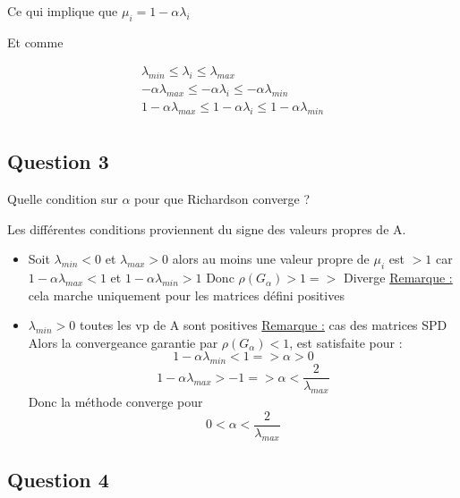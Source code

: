 \documentclass[11pt]{article}
\begin{document}
Ce qui implique que $\mu_i = 1 - \alpha \lambda_i$\newline

\vspace{5mm}

Et comme

\begin{gather*}
    \lambda_{min} \le \lambda_i \le \lambda_{max} \\
    - \alpha \lambda_{max} \le - \alpha \lambda_i \le - \alpha
    \lambda_{min} \\
    1 - \alpha \lambda_{max} \le 1 - \alpha \lambda_i \le 1 - \alpha
    \lambda_{min} \\
\end{gather*}

\subsection{Question 3}

Quelle condition sur $\alpha$ pour que Richardson converge ?\newline

\vspace{5mm}

Les différentes conditions proviennent du signe des valeurs propres de
A.

\begin{itemize}
\item Soit $\lambda_{min} < 0$ et $\lambda_{max} > 0$\newline
  alors au moins une valeur propre de $\mu_i$ est $> 1$\newline
  car $1 - \alpha \lambda_{max} < 1$ et $1 - \alpha \lambda_{min} > 1$\newline
  Donc $\rho(G_{\alpha}) > 1 =>$ Diverge \newline
  \underline{Remarque :} cela marche uniquement pour les matrices
  défini positives
\item $\lambda_{min} > 0$ toutes les vp de A sont positives\newline
  \underline{Remarque :} cas des matrices SPD\newline
  Alors la convergeance garantie par $\rho(G_{\alpha}) < 1$, est
  satisfaite pour :
  $$ 1 - \alpha \lambda_{min} < 1 => \alpha > 0 $$
  $$ 1 - \alpha \lambda_{max} > -1 => \alpha <
  \frac{2}{\lambda_{max}} $$
  Donc la méthode converge pour
  $$ 0 < \alpha < \frac{2}{\lambda_{max}} $$
\end{itemize}

\subsection{Question 4}
\end{document}
